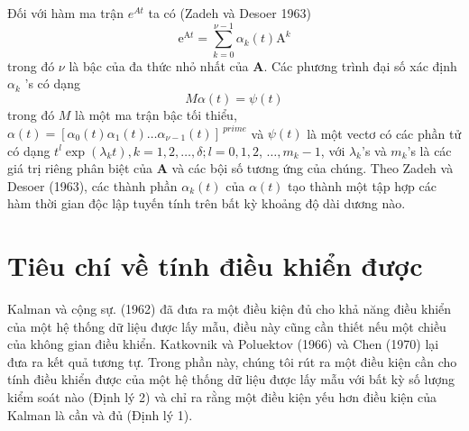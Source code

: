 \documentclass[12pt,a4paper]{article}
\begin{document}
Đối với hàm ma trận $e^{At}$ ta có (Zadeh và Desoer 1963)
\begin{equation}\tag{7}\label{pt7}
	\mathrm{e}^{\mathrm{A} t}=\sum_{k=0}^{\nu-1} \alpha_k(t) \mathrm{A}^k
\end{equation}
trong đó $\nu$ là bậc của đa thức nhỏ nhất của $\mathbf{A}$. Các phương trình đại số xác định $\alpha_k$ 's có dạng
$$
M \alpha(t)=\psi(t)
$$
trong đó $M$ là một ma trận bậc tối thiểu, $\alpha(t)=\left[\alpha_0(t) \alpha_1(t) \ldots \alpha_{\nu-1}(t)\right]^{\ prime}$ và $\psi(t)$ là một vectơ có các phần tử có dạng $t^l \exp \left(\lambda_k t\right), k=1,2, \ldots, \delta ; l=0,1,2$, $\ldots, m_k-1$, với $\lambda_k$'s và $m_k$'s là các giá trị riêng phân biệt của $\mathbf{A}$ và các bội số tương ứng của chúng. Theo Zadeh và Desoer (1963), các thành phần $\alpha_k(t)$ của $\alpha(t)$ tạo thành một tập hợp các hàm thời gian độc lập tuyến tính trên bất kỳ khoảng độ dài dương nào.


\section{Tiêu chí về tính điều khiển được}

Kalman và cộng sự. (1962) đã đưa ra một điều kiện đủ cho khả năng điều khiển của một hệ thống dữ liệu được lấy mẫu, điều này cũng cần thiết nếu một chiều của không gian điều khiển. Katkovnik và Poluektov (1966) và Chen (1970) lại đưa ra kết quả tương tự. Trong phần này, chúng tôi rút ra một điều kiện cần  cho tính điều khiển được của một hệ thống dữ liệu được lấy mẫu với bất kỳ số lượng kiểm soát nào (Định lý 2) và chỉ ra rằng một điều kiện yếu hơn điều kiện của Kalman là cần và đủ (Định lý 1).
\end{document}
